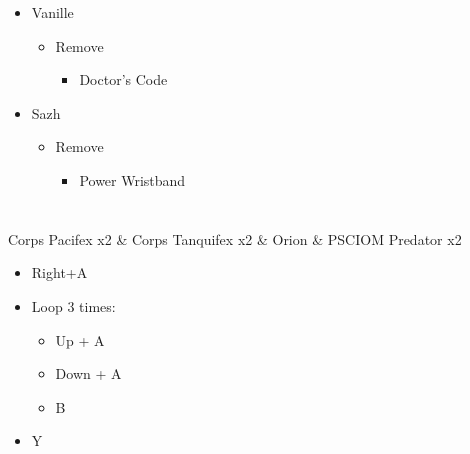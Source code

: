 \documentclass{report}
\begin{document}
\begin{menu}
\begin{itemize}
    \equip
    \begin{itemize}
        \item Vanille
        \begin{itemize}
            \item Remove
            \begin{itemize}
                \item Doctor's Code
            \end{itemize}
        \end{itemize}
        \item Sazh
        \begin{itemize}
            \item Remove
            \begin{itemize}
                \item Power Wristband
            \end{itemize}
        \end{itemize}
    \end{itemize}
\end{itemize}
\end{menu}

\chapter{}


\begin{battle}{Corps Pacifex x2 \& Corps Tanquifex x2 \& Orion \& PSCIOM Predator x2}
\begin{itemize}
    \item Right+A
    \item Loop 3 times:
    \begin{itemize}
        \item Up + A
        \item Down + A
        \item B
    \end{itemize}
    \item Y
\end{itemize}
   
\end{battle}

\end{document}

